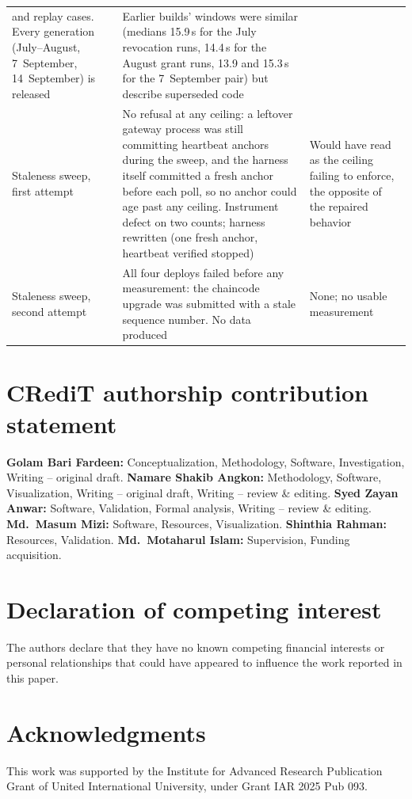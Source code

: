 \documentclass[preprint,12pt]{elsarticle}
\begin{document}
{\begin{longtable}{@{}>{\raggedright\arraybackslash}p{}%
                 >{\raggedright\arraybackslash}p{}%
                 >{\raggedright\arraybackslash}p{}@{}}
and replay cases. Every generation (July--August, 7~September, 14~September)
is released &
Earlier builds' windows were similar (medians 15.9\,s for the July revocation
runs, 14.4\,s for the August grant runs, 13.9 and 15.3\,s for the 7~September
pair) but describe superseded code \\
\addlinespace
Staleness sweep, first attempt &
No refusal at any ceiling: a leftover gateway process was still committing
heartbeat anchors during the sweep, and the harness itself committed a fresh
anchor before each poll, so no anchor could age past any ceiling. Instrument
defect on two counts; harness rewritten (one fresh anchor, heartbeat verified
stopped) &
Would have read as the ceiling failing to enforce, the opposite of the
repaired behavior \\
\addlinespace
Staleness sweep, second attempt &
All four deploys failed before any measurement: the chaincode upgrade was
submitted with a stale sequence number. No data produced &
None; no usable measurement \\
\end{longtable}}

\section*{CRediT authorship contribution statement}
\textbf{Golam Bari Fardeen:} Conceptualization, Methodology, Software,
Investigation, Writing -- original draft.
\textbf{Namare Shakib Angkon:} Methodology, Software, Visualization,
Writing -- original draft, Writing -- review \& editing.
\textbf{Syed Zayan Anwar:} Software, Validation, Formal analysis,
Writing -- review \& editing.
\textbf{Md.\ Masum Mizi:} Software, Resources, Visualization.
\textbf{Shinthia Rahman:} Resources, Validation.
\textbf{Md.\ Motaharul Islam:} Supervision, Funding acquisition.

\section*{Declaration of competing interest}
The authors declare that they have no known competing financial interests
or personal relationships that could have appeared to influence the work
reported in this paper.

\section*{Acknowledgments}
This work was supported by the Institute for Advanced Research Publication
Grant of United International University, under Grant IAR 2025 Pub 093.
\end{document}

